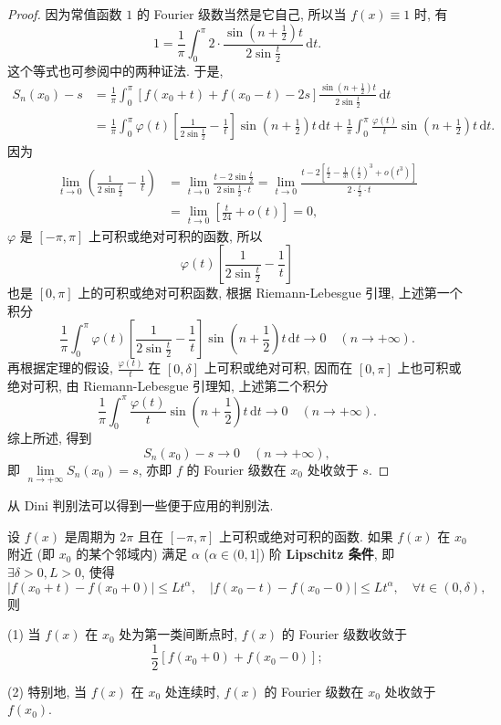 \begin{proof}
因为常值函数 $1$ 的 Fourier 级数当然是它自己, 所以当 $f(x)\equiv 1$ 时, 有
\[
  1=\frac{1}{\pi}\int_{0}^{\pi}2\cdot\frac{\sin\left(n+\frac{1}{2}\right)t}{2\sin\frac{t}{2}}\,\mathrm{d}t.
\]
这个等式也可参阅中的两种证法. 于是,
\[
  \begin{aligned}
    S_{n}(x_{0})-s&=\frac{1}{\pi}\int_{0}^{\pi}[f(x_{0}+t)+f(x_{0}-t)-2s]\frac{\sin\left(n+\frac{1}{2}\right)t}{2\sin\frac{t}{2}}\,\mathrm{d}t\\
    &=\frac{1}{\pi}\int_{0}^{\pi}\varphi(t)\left[\frac{1}{2\sin\frac{t}{2}}-\frac{1}{t}\right]\sin\left(n+\frac{1}{2}\right)t\,\mathrm{d}t+\frac{1}{\pi}\int_{0}^{\pi}\frac{\varphi(t)}{t}\sin\left(n+\frac{1}{2}\right)t\,\mathrm{d}t.
  \end{aligned}
\]
因为
\[
  \begin{aligned}
    \lim_{t\to 0}\left(\frac{1}{2\sin\frac{t}{2}}-\frac{1}{t}\right)&=\lim_{t\to 0}\frac{t-2\sin\frac{t}{2}}{2\sin\frac{t}{2}\cdot t}=\lim_{t\to 0}\frac{t-2\left[\frac{t}{2}-\frac{1}{3!}\left(\frac{t}{2}\right)^{3}+o(t^{3})\right]}{2\cdot\frac{t}{2}\cdot t}\\
    &=\lim_{t\to 0}\left[\frac{t}{24}+o(t)\right]=0,
  \end{aligned}
\]
$\varphi$ 是 $[-\pi,\pi]$ 上可积或绝对可积的函数, 所以
\[
  \varphi(t)\left[\frac{1}{2\sin\frac{t}{2}}-\frac{1}{t}\right]
\]
也是 $[0,\pi]$ 上的可积或绝对可积函数, 根据 Riemann-Lebesgue 引理, 上述第一个积分
\[
  \frac{1}{\pi}\int_{0}^{\pi}\varphi(t)\left[\frac{1}{2\sin\frac{t}{2}}-\frac{1}{t}\right]\sin\left(n+\frac{1}{2}\right)t\,\mathrm{d}t\to 0\quad(n\to+\infty).
\]
再根据定理的假设, $\displaystyle\frac{\varphi(t)}{t}$ 在 $[0,\delta]$ 上可积或绝对可积, 因而在 $[0,\pi]$ 上也可积或绝对可积, 由 Riemann-Lebesgue 引理知, 上述第二个积分
\[
  \frac{1}{\pi}\int_{0}^{\pi}\frac{\varphi(t)}{t}\sin\left(n+\frac{1}{2}\right)t\,\mathrm{d}t\to 0\quad(n\to+\infty).
\]
综上所述, 得到
\[
  S_{n}(x_{0})-s\to 0\quad(n\to+\infty),
\]
即 $\lim\limits_{n\to+\infty}S_{n}(x_{0})=s$, 亦即 $f$ 的 Fourier 级数在 $x_{0}$ 处收敛于 $s$.
\end{proof}

从 Dini 判别法可以得到一些便于应用的判别法.

\begin{corollary}\label{cor:16.1.1}
设 $f(x)$ 是周期为 $2\pi$ 且在 $[-\pi,\pi]$ 上可积或绝对可积的函数. 如果 $f(x)$ 在 $x_{0}$ 附近 (即 $x_{0}$ 的某个邻域内) 满足 $\alpha$ ($\alpha\in(0,1]$) 阶 \textbf{Lipschitz 条件}, 即 $\exists\delta>0, L>0$, 使得
\[
  |f(x_{0}+t)-f(x_{0}+0)|\leqslant L t^{\alpha},\quad |f(x_{0}-t)-f(x_{0}-0)|\leqslant L t^{\alpha},\quad \forall t\in(0,\delta),
\]
则

(1) 当 $f(x)$ 在 $x_{0}$ 处为第一类间断点时, $f(x)$ 的 Fourier 级数收敛于
\[
  \frac{1}{2}[f(x_{0}+0)+f(x_{0}-0)];
\]

(2) 特别地, 当 $f(x)$ 在 $x_{0}$ 处连续时, $f(x)$ 的 Fourier 级数在 $x_{0}$ 处收敛于 $f(x_{0})$.
\end{corollary}

